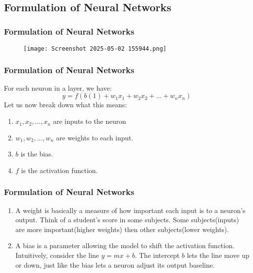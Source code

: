 \documentclass{beamer}
\begin{document}
\begin{frame}
\section{Formulation of Neural Networks}
\frametitle{Formulation of Neural Networks}
\begin{tcolorbox}
[colback=blue!5!white ,colframe=blue!75!black,title=Biological Neuron vs Artificial Neuron]
\begin{figure}
    \centering
    \texttt{[image: Screenshot 2025-05-02 155944.png]}
\end{figure}
\end{tcolorbox}
\end{frame}
\begin{frame}
\frametitle{Formulation of Neural Networks}
\begin{tcolorbox}
[colback=blue!5!white,colframe=blue!75!black,title=Mathematical Formulation of Neural Networks]
For each neuron in a layer, we have:
$$y=f(b(1)+w_1x_1+w_2x_2+\dots+w_nx_n)$$
Let us now break down what this means:\\
\begin{enumerate}
    \item $x_1,x_2,\dots,x_n$ are inputs to the neuron
    \item $w_1,w_2,\dots,w_n$ are weights to each input. 
    \item $b$ is the bias.
    \item $f$ is the activation function.
\end{enumerate}
\end{tcolorbox}
\end{frame}
\begin{frame}
\frametitle{Formulation of Neural Networks}
\begin{tcolorbox}
[colback=blue!5!white,colframe=blue!75!black,title=Further Clarification]
\begin{enumerate}
    \item A weight is basically a measure of how important each input is to a neuron's output. Think of a student's score in some subjects. Some subjects(inputs) are more important(higher weights) then other subjects(lower weights). 
    \item A bias is a parameter allowing the model to shift the activation function. Intuitively, consider the line $y=mx+b$. The intercept $b$ lets the line move up or down, just like the bias lets a neuron adjust its output baseline.
\end{enumerate}
\end{tcolorbox}
\end{frame}
\end{document}
